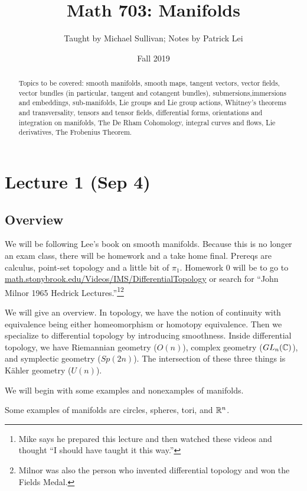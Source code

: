 \documentclass[twoside, 10pt]{article}
\title{Math 703: Manifolds}
\author{Taught by Michael Sullivan; Notes by Patrick Lei}
\affil{University of Massachusetts, Amherst}
\date{Fall 2019}
\begin{document}
    \maketitle\thispagestyle{firstpage}
    
    \begin{abstract}
        Topics to be covered: smooth manifolds, smooth maps, tangent vectors, vector fields, vector bundles (in particular, tangent and cotangent bundles), submersions,immersions and embeddings, sub-manifolds, Lie groups and Lie group actions, Whitney's theorems and transversality, tensors and tensor fields, differential forms, orientations and integration on manifolds, The De Rham Cohomology, integral curves and flows, Lie derivatives, The Frobenius Theorem.
    \end{abstract}

    \tableofcontents

    \section{Lecture 1 (Sep 4)}%
    \label{sec:lecture_1_sep_4_}

    \subsection{Overview}%
    \label{sub:overview_and_examples}
    
    
    We will be following Lee's book on smooth manifolds. Because this is no longer an exam class, there will be homework and a take home final. Prereqs are calculus, point-set topology and a little bit of $\pi_1$. Homework $0$ will be to go to \url{math.stonybrook.edu/Videos/IMS/DifferentialTopology} or search for ``John Milnor 1965 Hedrick Lectures.''\footnote{Mike says he prepared this lecture and then watched these videos and thought ``I should have taught it this way.''}\footnote{Milnor was also the person who invented differential topology and won the Fields Medal.}

    
    We will give an overview. In topology, we have the notion of continuity with equivalence being either homeomorphism or homotopy equivalence. Then we specialize to differential topology by introducing smoothness. Inside differential topology, we have Riemannian geometry ($O(n)$), complex geometry ($GL_n(\mathbb{C})$), and symplectic geometry ($Sp(2n)$). The intersection of these three things is K\"ahler geometry ($U(n)$).

    We will begin with some examples and nonexamples of manifolds.
    \begin{exm}
        Some examples of manifolds are circles, spheres, tori, and $\mathbb{R}^n$. 
    \end{exm}
\end{document}
